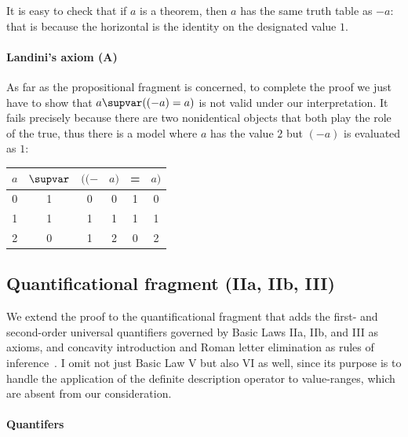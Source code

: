 \documentclass{preprint}
\renewcommand{\to}{\supvar}
\begin{document}
It is easy to check that if $a$ is a theorem, then $a$ has the same truth table as $-a$: that is because the horizontal is the identity on the designated value $1$.  

\paragraph{Landini's axiom (A)} As far as the propositional fragment is concerned, to complete the proof we just have to show that $a \to ((-a)=a)$ is not valid under our interpretation. It fails precisely because there are two nonidentical objects that both play the role of the true, thus there is a model where $a$ has the value $2$ but $(-a)$ is evaluated as $1$: 

\begin{center}
	\begin{tabular}{c c c c c c }
		$a$ & $\to$ & $((-$ & $a )$ & = & $a )$ \\
		\hline
		0 & 1 & 0 & 0& 1& 0\\
		1 & 1 & 1 & 1& 1& 1\\
		2 & 0 & 1 & 2& 0& 2\\
	\end{tabular}
\end{center}

\subsection{Quantificational fragment (IIa, IIb, III)} \label{axioms}


We extend the proof to the quantificational fragment that adds the first- and second-order universal quantifiers governed by Basic Laws IIa, IIb, and III as axioms, and concavity introduction and Roman letter elimination as rules of inference~\cite[\S\S3.4.5--6]{sep-frege-logic}. 
I omit not just Basic Law V but also VI as well, since its purpose is to handle the application of the definite description operator to value-ranges, which are absent from our consideration. 

\paragraph{Quantifers}
\end{document}
